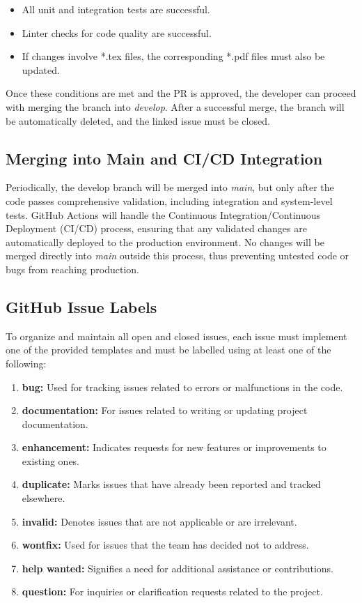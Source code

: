 \documentclass{article}
\begin{document}
\begin{itemize}
    \item All unit and integration tests are successful.
    \item Linter checks for code quality are successful.
    \item If changes involve *.tex files, the corresponding *.pdf files must also be updated.
\end{itemize}

Once these conditions are met and the PR is approved, the developer can proceed with merging the branch into \textit{develop}. After a successful merge, the branch will be automatically deleted, and the linked issue must be closed.

\subsection*{Merging into Main and CI/CD Integration}
Periodically, the develop branch will be merged into \textit{main}, but only after the code passes comprehensive validation, including integration and system-level tests. GitHub Actions will handle the Continuous Integration/Continuous Deployment (CI/CD) process, ensuring that any validated changes are automatically deployed to the production environment. No changes will be merged directly into \textit{main} outside this process, thus preventing untested code or bugs from reaching production.

\subsection*{GitHub Issue Labels}

To organize and maintain all open and closed issues, each issue must implement one of the provided templates and must be labelled using at least one of the following:

\begin{enumerate}
    \item \textbf{bug:} Used for tracking issues related to errors or malfunctions in the code.
    \item \textbf{documentation:} For issues related to writing or updating project documentation.
    \item \textbf{enhancement:} Indicates requests for new features or improvements to existing ones.
    \item \textbf{duplicate:} Marks issues that have already been reported and tracked elsewhere.
    \item \textbf{invalid:} Denotes issues that are not applicable or are irrelevant.
    \item \textbf{wontfix:} Used for issues that the team has decided not to address.
    \item \textbf{help wanted:} Signifies a need for additional assistance or contributions.
    \item \textbf{question:} For inquiries or clarification requests related to the project.
\end{enumerate}
\end{document}
